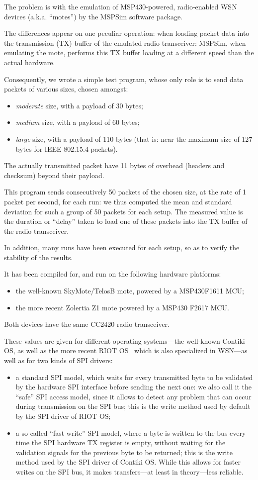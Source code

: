 \documentclass[10pt]{ewsn-proc}
\begin{document}
The problem is with the emulation of MSP430-powered, radio-enabled WSN
devices (a.k.a. ``motes'') by the MSPSim software package.

The differences appear on one peculiar operation: when loading packet data
into the transmission (TX) buffer of the emulated radio transceiver:
MSPSim, when emulating the mote, performs this TX buffer loading at
a different speed than the actual hardware.

Consequently, we wrote a simple test program, whose only role is to send
data packets of various sizes, chosen amongst:
\begin{itemize}
\item \emph{moderate} size, with a payload of 30 bytes;
\item \emph{medium} size, with a payload of 60 bytes;
\item \emph{large} size, with a payload of 110 bytes (that is:
      near the maximum size of 127 bytes for IEEE 802.15.4 packets).
\end{itemize}
The actually transmitted packet have 11 bytes of overhead (headers and
checksum) beyond their payload.

This program sends consecutively 50 packets of the chosen size, at the rate
of 1 packet per second, for each run: we thus computed the mean and
standard deviation for such a group of 50 packets for each setup.
The measured value is the duration or ``delay'' taken to load one of these
packets into the TX buffer of the radio transceiver.

In addition, many runs have been executed for each setup, so as to verify
the stability of the results.

It has been compiled for, and run on the following hardware platforms:
\begin{itemize}
\item the well-known SkyMote/TelosB mote, powered by a MSP430F1611 MCU;
\item the more recent Zolertia Z1 mote powered by a MSP430 F2617 MCU.
\end{itemize}
Both devices have the same CC2420 radio transceiver.

These values are given for different operating systems---the well-known
Contiki OS, as well as the more recent RIOT OS~\cite{RIOT} which is also
specialized in WSN---as well as for two kinds of SPI drivers:
\begin{itemize}
\item a standard SPI model, which waits for every transmitted byte to be
validated by the hardware SPI interface before sending the next one:
we also call it the ``safe'' SPI access model, since it allows to detect
any problem that can occur during transmission on the SPI bus; this is
the write method used by default by the SPI driver of RIOT OS;
\item a so-called ``fast write'' SPI model, where a byte is written to
the bus every time the SPI hardware TX register is empty, without waiting
for the validation signals for the previous byte to be returned; this is
the write method used by the SPI driver of Contiki OS. While this allows
for faster writes on the SPI bus, it makes transfers---at least in
theory---less reliable.
\end{itemize}
\end{document}
